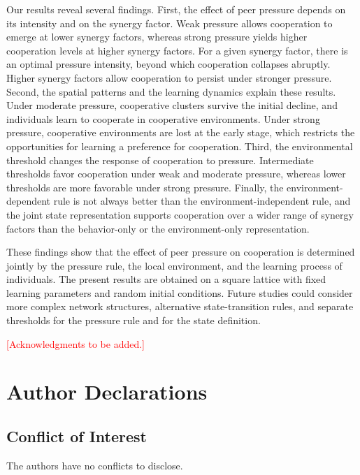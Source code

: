 \documentclass[%
  aip,cha,
  amsmath,amssymb,
  reprint,
  floatfix,
  article-title,
]{revtex4-2}
\newcommand{\AQ}[1]{\textcolor{red}{[#1]}}
\begin{document}
Our results reveal several findings. First, the effect of peer pressure depends on its intensity and on the synergy factor. Weak pressure allows cooperation to emerge at lower synergy factors, whereas strong pressure yields higher cooperation levels at higher synergy factors. For a given synergy factor, there is an optimal pressure intensity, beyond which cooperation collapses abruptly. Higher synergy factors allow cooperation to persist under stronger pressure. Second, the spatial patterns and the learning dynamics explain these results. Under moderate pressure, cooperative clusters survive the initial decline, and individuals learn to cooperate in cooperative environments. Under strong pressure, cooperative environments are lost at the early stage, which restricts the opportunities for learning a preference for cooperation. Third, the environmental threshold changes the response of cooperation to pressure. Intermediate thresholds favor cooperation under weak and moderate pressure, whereas lower thresholds are more favorable under strong pressure. Finally, the environment-dependent rule is not always better than the environment-independent rule, and the joint state representation supports cooperation over a wider range of synergy factors than the behavior-only or the environment-only representation.

These findings show that the effect of peer pressure on cooperation is determined jointly by the pressure rule, the local environment, and the learning process of individuals. The present results are obtained on a square lattice with fixed learning parameters and random initial conditions. Future studies could consider more complex network structures,\cite{shi2024model,zhu2025multilayer} alternative state-transition rules,\cite{guo2022effect} and separate thresholds for the pressure rule and for the state definition.


\begin{acknowledgments}
\AQ{Acknowledgments to be added.}
\end{acknowledgments}

\section*{Author Declarations}

\subsection*{Conflict of Interest}
The authors have no conflicts to disclose.
\end{document}
